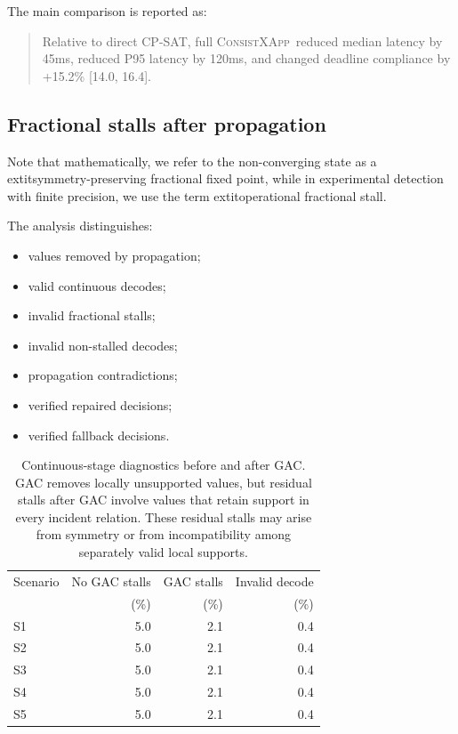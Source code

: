 \documentclass[pdflatex,sn-mathphys-num,iicol,oneside]{sn-jnl}
\newcommand{\method}{\textsc{ConsistXApp}}
\begin{document}
The main comparison is reported as:

\begin{quote}
Relative to direct CP-SAT, full \method\
reduced median latency by 45ms,
reduced P95 latency by 120ms, and changed
deadline compliance by +15.2\% [14.0, 16.4].
\end{quote}

\subsection{Fractional stalls after propagation}

Note that mathematically, we refer to the non-converging state as a 	extit{symmetry-preserving fractional fixed point}, while in experimental detection with finite precision, we use the term 	extit{operational fractional stall}.

The analysis distinguishes:

\begin{itemize}
    \item values removed by propagation;
    \item valid continuous decodes;
    \item invalid fractional stalls;
    \item invalid non-stalled decodes;
    \item propagation contradictions;
    \item verified repaired decisions;
    \item verified fallback decisions.
\end{itemize}

\begin{table}[t]
\centering
\caption{Continuous-stage diagnostics before and after GAC. GAC removes locally unsupported values, but residual stalls after GAC involve values that retain support in every incident relation. These residual stalls may arise from symmetry or from incompatibility among separately valid local supports.}
\label{tab:stall-results}
\begin{tabular}{lrrr}
\toprule
Scenario &
No GAC stalls &
GAC stalls &
Invalid decode\\
&
(\%) &
(\%) &
(\%)\\
\midrule
S1 & 5.0 & 2.1 & 0.4\\
S2 & 5.0 & 2.1 & 0.4\\
S3 & 5.0 & 2.1 & 0.4\\
S4 & 5.0 & 2.1 & 0.4\\
S5 & 5.0 & 2.1 & 0.4\\
\bottomrule
\end{tabular}
\end{table}
\end{document}
